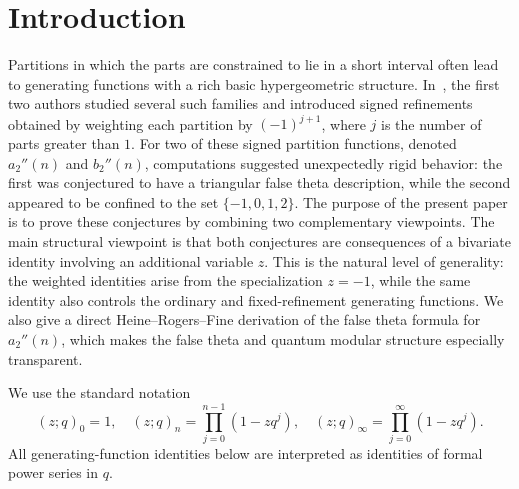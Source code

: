 \documentclass[reqno]{amsart}
\theoremstyle{definition}
\theoremstyle{plain}
\theoremstyle{remark}
\numberwithin{equation}{section}
\begin{document}
\section{Introduction}
%
Partitions in which the parts are constrained to lie in a short interval often lead to generating functions with a rich basic hypergeometric structure. In~\cite{Andrews-Bachraoui conjectures}, the first two authors studied several such families and introduced signed refinements obtained by weighting each partition by $(-1)^{j+1}$, where $j$ is the number of parts greater than $1$. For two of these signed partition functions, denoted $a_2''(n)$ and $b_2''(n)$, computations suggested unexpectedly rigid behavior: the first was conjectured to have a triangular false theta description, while the second appeared to be confined to the set $\{-1,0,1,2\}$. The purpose of the present paper is to prove these conjectures by combining two complementary viewpoints.  The main structural viewpoint is that both conjectures are consequences of a bivariate identity involving an additional variable $z$.  This is the natural level of generality: the weighted identities arise from the specialization $z=-1$, while the same identity also controls the ordinary and fixed-refinement generating functions.  We also give a direct Heine--Rogers--Fine derivation of the false theta formula for $a_2''(n)$, which makes the false theta and quantum modular structure especially transparent.

We use the standard notation~\cite{Andrews, Gasper-Rahman}
\[
(z;q)_0 = 1,\quad  (z;q)_n = \prod_{j=0}^{n-1} (1-zq^j),\quad
(z;q)_{\infty} = \prod_{j=0}^{\infty} (1-zq^j).
\]
All generating-function identities below are interpreted as identities of formal power series in $q$.
\end{document}
